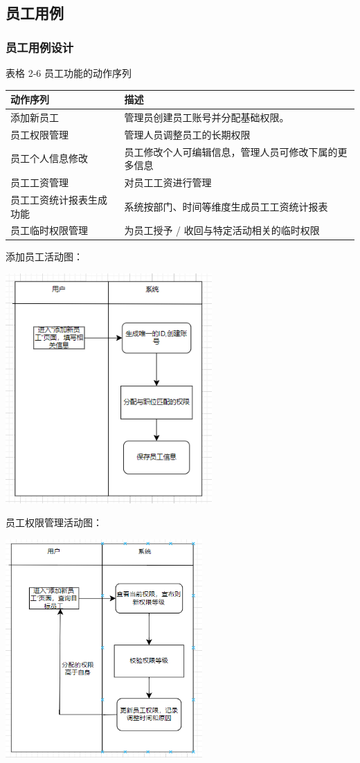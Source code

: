 \documentclass[]{article}
\begin{document}
\hypertarget{ux5458ux5de5ux7528ux4f8b}{%
\subsection{员工用例}\label{ux5458ux5de5ux7528ux4f8b}}

\hypertarget{ux5458ux5de5ux7528ux4f8bux8bbeux8ba1}{%
\subsubsection{员工用例设计}\label{ux5458ux5de5ux7528ux4f8bux8bbeux8ba1}}

表格 2‑6 员工功能的动作序列

\begin{longtable}[]{@{}ll@{}}
\toprule
动作序列 & 描述\tabularnewline
\midrule
\endhead
添加新员工 & 管理员创建员工账号并分配基础权限。\tabularnewline
员工权限管理 & 管理人员调整员工的长期权限\tabularnewline
员工个人信息修改 &
员工修改个人可编辑信息，管理人员可修改下属的更多信息\tabularnewline
员工工资管理 & 对员工工资进行管理\tabularnewline
员工工资统计报表生成功能 &
系统按部门、时间等维度生成员工工资统计报表\tabularnewline
员工临时权限管理 & 为员工授予 /
收回与特定活动相关的临时权限\tabularnewline
\bottomrule
\end{longtable}

添加员工活动图：

\includegraphics[width=3.10417in,height=3.45694in]{media/media/image8.png}

员工权限管理活动图：

\includegraphics[width=2.95972in,height=3.28333in]{media/media/image9.png}
\end{document}
